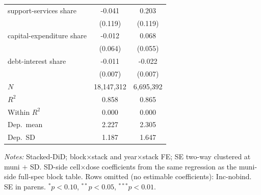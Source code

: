 \begin{table}[!htbp]
\begin{tabular}{lcc}
    support-services share & -0.041 & 0.203\sym{*} \\
                      & (0.119) & (0.119) \\
    capital-expenditure share & -0.012 & 0.068 \\
                      & (0.064) & (0.055) \\
    debt-interest share & -0.011 & -0.022\sym{***} \\
                      & (0.007) & (0.007) \\
    \midrule
    $N$ & 18,147,312 & 6,695,392 \\
    $R^2$ & 0.858 & 0.865 \\
    Within $R^2$ & 0.000 & 0.000 \\
    Dep.\ mean & 2.227 & 2.305 \\
    Dep.\ SD & 1.187 & 1.647 \\
    \bottomrule
  \end{tabular}
  \vspace{0.3em}
  \begin{minipage}{0.95\textwidth}
    \footnotesize \textit{Notes:} Stacked-DiD; block$\times$stack and year$\times$stack FE; SE two-way clustered at muni $+$ SD. SD-side cell$\times$dose coefficients from the same regression as the muni-side full-spec block table. Rows omitted (no estimable coefficients): Inc-nobind. SE in parens. $^{*}p<0.10$, $^{**}p<0.05$, $^{***}p<0.01$.
  \end{minipage}
\end{table}
